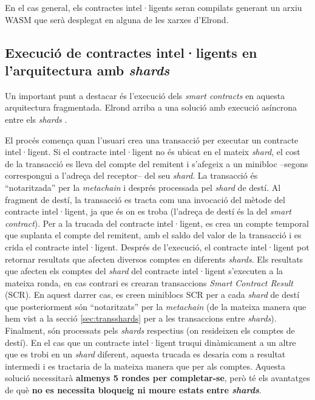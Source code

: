 \documentclass[11pt,a4paper]{article}
\begin{document}
En el cas general, els contractes intel·ligents seran compilats generant un arxiu WASM que serà desplegat en alguna de les xarxes d'Elrond. 

\subsection{Execució de contractes intel·ligents en l'arquitectura amb \textit{shards}}

Un important punt a destacar és l'execució dels \textit{smart contracts} en aquesta arquitectura fragmentada. Elrond arriba a una solució amb execució asíncrona entre els \textit{shards} \cite{elrond2019}. 

El procés comença quan l'usuari crea una transacció per executar un contracte intel·ligent. Si el contracte intel·ligent no és ubicat en el mateix \textit{shard}, el cost de la transacció es lleva del compte del remitent i s'afegeix a un minibloc –segons correspongui a l'adreça del receptor– del seu \textit{shard}. La transacció és ``notaritzada'' per la \textit{metachain} i després processada pel \textit{shard} de destí. Al fragment de destí, la transacció es tracta com una invocació del mètode del contracte intel·ligent, ja que és on es troba (l'adreça de destí és la del \textit{smart contract}). Per a la trucada del contracte intel·ligent, es crea un compte temporal que suplanta el compte del remitent, amb el saldo del valor de la transacció i es crida el contracte intel·ligent. Després de l'execució, el contracte intel·ligent pot retornar resultats que afecten diversos comptes en diferents \textit{shards}. Els resultats que afecten els comptes del \textit{shard} del contracte intel·ligent s'executen a la mateixa ronda, en cas contrari es crearan transaccions \textit{Smart Contract Result} (SCR). En aquest darrer cas, es creen miniblocs SCR per a cada \textit{shard} de destí que posteriorment són ``notaritzats'' per la \textit{metachain} (de la mateixa manera que hem vist a la secció \ref{sec:transshards} per a les transaccions entre \textit{shards}). Finalment, són processats pels \textit{shards} respectius (on resideixen els comptes de destí). En el cas que un contracte intel·ligent truqui dinàmicament a un altre que es trobi en un \textit{shard} diferent, aquesta trucada es desaria com a resultat intermedi i es tractaria de la mateixa manera que per als comptes. Aquesta solució necessitarà \textbf{almenys 5 rondes per completar-se}, però té els avantatges de què \textbf{no es necessita bloqueig ni moure estats entre \textit{shards}}.
\end{document}
